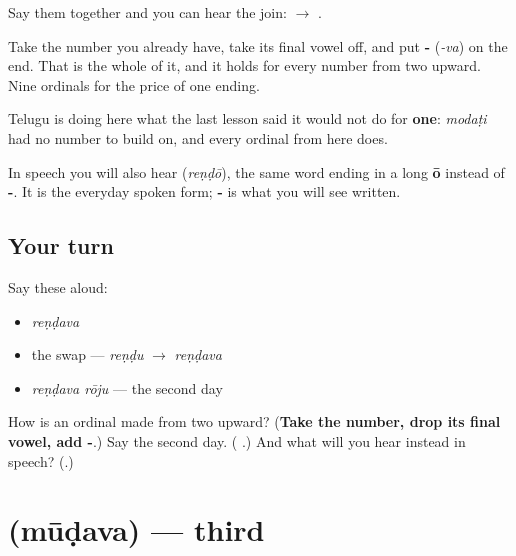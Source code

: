 \begin{grammarlens}[title={Grammar Lens: cardinal, minus its last vowel, plus -\te{వ}}]
Say them together and you can hear the join: \textbf{} $\to$ \textbf{}.

Take the number you already have, take its final vowel off, and put \textbf{-} (\emph{-va}) on the end. That is the whole of it, and it holds for every number from two upward. Nine ordinals for the price of one ending.

Telugu is doing here what the last lesson said it would not do for \textbf{one}: \emph{modaṭi} had no number to build on, and every ordinal from here does.

In speech you will also hear \textbf{} (\emph{reṇḍō}), the same word ending in a long \textbf{ō} instead of \textbf{-}. It is the everyday spoken form; \textbf{-} is what you will see written.
\end{grammarlens}

\subsection*{Your turn}
Say these aloud:

\begin{itemize}
\raggedright
  \item \emph{reṇḍava}
  \item the swap — \emph{reṇḍu} $\to$ \emph{reṇḍava}
  \item \emph{reṇḍava rōju} — the second day
\end{itemize}

\begin{tcolorbox}[breakable,colback=teal!4,colframe=teal!35!black,title={Before you move on}]
How is an ordinal made from two upward? (\textbf{Take the number, drop its final vowel, add -}.) Say the second day. (\textbf{ }.) And what will you hear instead in speech? (\textbf{}.)
\end{tcolorbox}
\section[\texorpdfstring{\te{మూడవ} (mūḍava)}{మూడవ (mūḍava)}]{ (mūḍava) — third}

\label{lesson:TE-C81-third}




